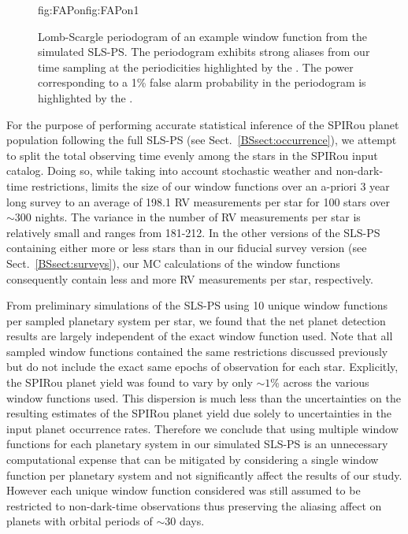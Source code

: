 \begin{figure}
\begin{ocg}{fig:FAPon}{fig:FAPon}{1}
  \end{ocg}
  \hspace{-0.8\hsize}%
  \caption[Lomb-Scargle periodogram of an expected SPIRou window function during the SLS-PS.]
    {\small Lomb-Scargle periodogram of an example window function from the simulated SLS-PS.
    The periodogram exhibits strong aliases from our time sampling at the periodicities
    highlighted by the 
    . The power
    corresponding to a 1\% false alarm probability in the periodogram is highlighted by the  
    .}
  \label{BSfig:wfs}
\end{figure}

For the purpose of performing accurate statistical inference of the SPIRou planet population
following the full SLS-PS (see Sect.~\ref{BSsect:occurrence}),
we attempt to split the total observing time evenly among the stars in the
SPIRou input catalog. Doing so, while taking into account stochastic weather and non-dark-time restrictions,
limits the size of our window functions over an a-priori 3 year long survey to an average of
198.1 RV measurements per star for 100 stars over $\sim 300$ nights. The variance in the number of RV
measurements per star is relatively small and ranges from 181-212. 
In the other versions of the SLS-PS containing either more or less stars than in our fiducial survey version
(see Sect.~\ref{BSsect:surveys}),
our MC calculations of the window functions consequently contain less and more RV measurements per star, respectively.

From preliminary simulations of the SLS-PS using 10 unique window functions per sampled planetary system per star,
we found that the net planet detection results are largely independent of the exact window function used. Note that
all sampled window functions contained the same restrictions discussed previously but do not include the exact
same epochs of observation for each star. Explicitly,
the SPIRou planet yield was found to vary by only $\sim 1$\% across the various window functions used.
This dispersion is much
less than the uncertainties on the resulting estimates of the SPIRou planet yield due solely to uncertainties in
the input planet occurrence rates. Therefore we conclude that using multiple window functions for each planetary
system in our simulated
SLS-PS is an unnecessary computational expense that can be mitigated by considering a single window function
per planetary system and not significantly affect the results of our study. However each unique window function considered
was still assumed to be restricted to non-dark-time observations thus preserving the aliasing affect on planets with
orbital periods of $\sim 30$ days.


